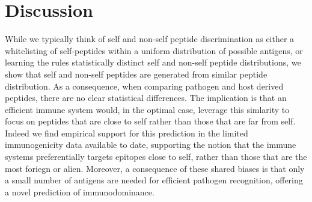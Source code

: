 \documentclass[superscriptaddress,twocolumn,pre]{revtex4}
\newcommand{\<}{\langle}
\renewcommand{\>}{\rangle}
\begin{document}
%
%

\section{Discussion}

While we typically think of self and non-self peptide discrimination as either a whitelisting of self-peptides within a uniform distribution of possible antigens, or learning the rules statistically distinct self and non-self peptide distributions, we show that self and non-self peptides are generated from similar peptide distribution. As a consequence, when comparing pathogen and host derived peptides, there are no clear statistical differences. The implication is that an efficient immune system would, in the optimal case, leverage this simlarity to focus on peptides that are close to self rather than those that are far from self. Indeed we find empirical support for this prediction in the limited immunogenicity data available to date, supporting the notion that the immune systems preferentially targets epitopes close to self, rather than those that are the most foriegn or alien. Moreover, a consequence of these shared biases is that only a small number of antigens are needed for efficient pathogen recognition, offering a novel prediction of immunodominance.
\end{document}

